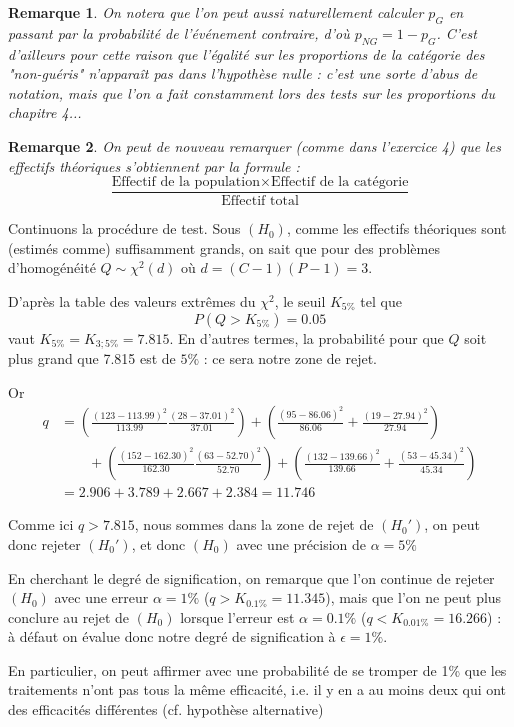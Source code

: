 \documentclass[a4paper,oneside,12pt]{article}
\theoremstyle{plain}
\newtheorem*{remark}{Remarque}
\begin{document}
\begin{enumerate}
    \begin{remark}
        On notera que l'on peut aussi naturellement calculer $p_G$ en passant par la probabilité de l'événement contraire, d'où $p_{NG} = 1 - p_G$. C'est d'ailleurs pour cette raison que l'égalité sur les proportions de la catégorie des "non-guéris" n'apparaît pas dans l'hypothèse nulle : c'est une sorte d'abus de notation, mais que l'on a fait constamment lors des tests sur les proportions du chapitre 4...
    \end{remark}

    \begin{remark}
        On peut de nouveau remarquer (comme dans l'exercice 4) que les effectifs théoriques s'obtiennent par la formule :
        $$\frac{\mbox{Effectif de la population} \times \mbox{Effectif de la catégorie}}{\mbox{Effectif total}}$$
    \end{remark}

    Continuons la procédure de test. Sous $(H_0)$, comme les effectifs théoriques sont (estimés comme) suffisamment grands, on sait que pour des problèmes d'homogénéité $Q\sim \chi^2(d)$ où $d=(C-1)(P-1)=3$.

    D'après la table des valeurs extrêmes du $\chi^2$, le seuil $K_{5\%}$ tel que $$P(Q>K_{5\%}) = 0.05$$ vaut $K_{5\%}=K_{3;5\%} =7.815$. En d'autres termes, la probabilité pour que $Q$ soit plus grand que 7.815 est de $5\%$ : ce sera notre zone de rejet.

    Or 
    \begin{align*}
        q &= \left ( \frac{(123-113.99)^2}{113.99} \frac{(28-37.01)^2}{37.01}\right ) + \left ( \frac{(95-86.06)^2}{86.06} + \frac{(19-27.94)^2}{27.94}\right )\\
        & \qquad + \left ( \frac{(152-162.30)^2}{162.30} \frac{(63-52.70)^2}{52.70}\right ) + \left ( \frac{(132-139.66)^2}{139.66} + \frac{(53-45.34)^2}{45.34}\right )\\ 
        & = 2.906 + 3.789 + 2.667 + 2.384 = 11.746
    \end{align*}


    Comme ici $q>7.815$, nous sommes dans la zone de rejet de $(H_0')$, on peut donc rejeter $(H_0')$, et donc $(H_0)$ avec une précision de $\alpha = 5\%$

    En cherchant le degré de signification, on remarque que l'on continue de rejeter $(H_0)$ avec une erreur $\alpha = 1\%$ ($q>K_{0.1\%} = 11.345$), mais que l'on ne peut plus conclure au rejet de $(H_0)$ lorsque l'erreur est $\alpha = 0.1\%$ ($q<K_{0.01\%} = 16.266$) : à défaut on évalue donc notre degré de signification à $\epsilon = 1\%$.

    En particulier, on peut affirmer avec une probabilité de se tromper de 1\% que les traitements n'ont pas tous la même efficacité, i.e. il y en a au moins deux qui ont des efficacités différentes (cf. hypothèse alternative)
\end{enumerate}
\end{document}
